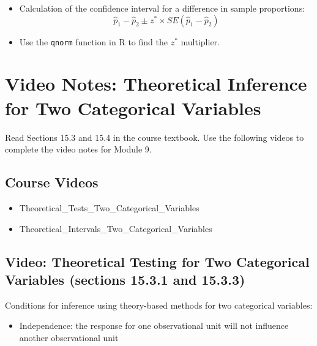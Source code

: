 \documentclass[
]{report}
\providecommand{\tightlist}{%
  \setlength{\itemsep}{0pt}\setlength{\parskip}{0pt}}
\begin{document}
\begin{itemize}
  \begin{itemize}
  \tightlist
  \item
    Calculation of the confidence interval for a difference in sample proportions:
    \[\hat{p}_1-\hat{p}_2\pm z^*\times SE(\hat{p}_1-\hat{p}_2)\]
  \item
    Use the \texttt{qnorm} function in R to find the \(z^*\) multiplier.
  \end{itemize}
\end{itemize}

\newpage

\section{Video Notes: Theoretical Inference for Two Categorical Variables}\label{video-notes-theoretical-inference-for-two-categorical-variables}

Read Sections 15.3 and 15.4 in the course textbook. Use the following videos to complete the video notes for Module 9.

\subsection{Course Videos}\label{course-videos-7}

\begin{itemize}
\item
  Theoretical\_Tests\_Two\_Categorical\_Variables
\item
  Theoretical\_Intervals\_Two\_Categorical\_Variables
\end{itemize}


\subsection*{Video: Theoretical Testing for Two Categorical Variables (sections 15.3.1 and 15.3.3)}\label{video-theoretical-testing-for-two-categorical-variables-sections-15.3.1-and-15.3.3}

Conditions for inference using theory-based methods for two categorical variables:

\begin{itemize}
\tightlist
\item
  Independence: the response for one observational unit will not influence another observational unit
\end{itemize}
\end{document}
